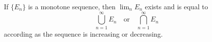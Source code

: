 If $\{E_n\}$ is a monotone sequence, then $\lim_n E_n$ exists and is equal to
$$\bigcup_{n=1}^{\infty} E_n \quad \text{or} \quad \bigcap_{n=1}^{\infty} E_n$$
according as the sequence is increasing or decreasing.
